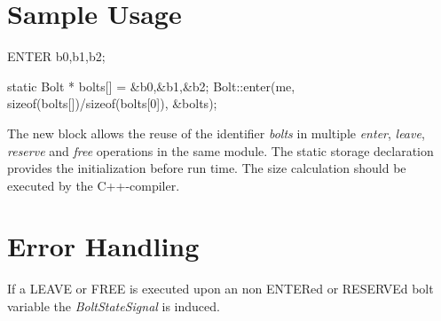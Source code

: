 \section{Sample Usage}

\begin{PEARLCode}
ENTER b0,b1,b2;
\end{PEARLCode}

\begin{CppCode}
{
   static Bolt * bolts[] = {&b0,&b1,&b2};
   Bolt::enter(me,
               sizeof(bolts[])/sizeof(bolts[0]),
               &bolts);
}
\end{CppCode}

The new block allows the reuse of the identifier {\em bolts} in multiple
{\em enter}, {\em leave}, {\em reserve} and {\em free} operations
 in the same module.
The static storage declaration provides the initialization before run time.
The size calculation should be executed by the C++-compiler.

\section{Error Handling}
If a LEAVE or FREE is executed upon an non ENTERed or RESERVEd
bolt variable the {\em BoltStateSignal} is induced.

